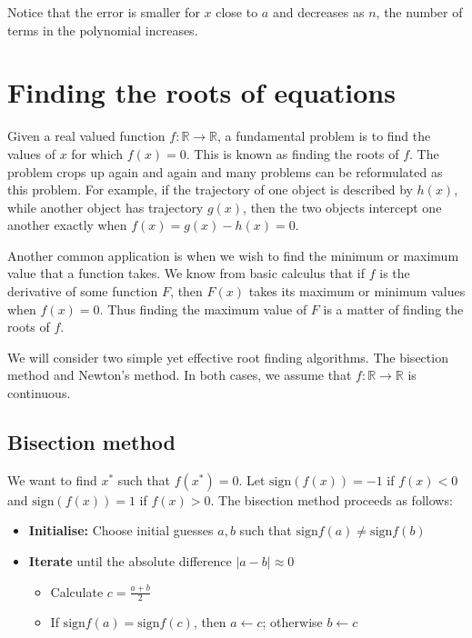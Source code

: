 Notice that the error is smaller for $x$ close to $a$ and decreases as $n$, the number of terms in the polynomial increases.   \sqend


\section{Finding the roots of equations}

Given a real valued function $f:\mathbb R \to \mathbb R$,  a fundamental problem is to find the values of $x$ for which $f(x) = 0$.  This is known as finding the roots of $f$.  The problem crops up again and again and many problems can be reformulated as this problem.  For example, if the trajectory of one object is described by $h(x)$, while another object has trajectory $g(x)$, then the two objects intercept one another exactly when $f(x) = g(x) - h(x) = 0. $

Another common application is when we wish to find the minimum or maximum value that a function takes.  We know from basic calculus that if $f$ is the derivative of some function $F$, then $F(x)$ takes its  maximum or minimum values when $f(x) = 0$.  Thus finding the maximum value of $F$ is a matter of finding the roots of $f$.  

We will consider two simple yet effective root finding algorithms.  The bisection method and Newton's method.  In both cases, we assume that $f:\mathbb R \to \mathbb R$ is continuous.

\subsection{Bisection method}

We want to find $x^*$ such that $f(x^*) = 0$.  Let $\mathrm{sign}(f(x)) = -1$ if $f(x) < 0$ and $\mathrm{sign}(f(x)) = 1$ if $f(x) > 0$.  The bisection method proceeds as follows:

\begin{itemize}
\item {\bf Initialise:} Choose initial guesses $a, b$ such that $\mathrm{sign} f(a) \ne\mathrm{sign} f(b)$
\item {\bf Iterate} until the absolute difference $ |a-b| \approx 0$
\begin{itemize} 
\item Calculate $c=\frac{a+b}{2}$
\item If $\mathrm{sign} f(a) =\mathrm{sign} f(c)$, then $a\leftarrow c$; otherwise $b\leftarrow c$
\end{itemize}
\end{itemize}

